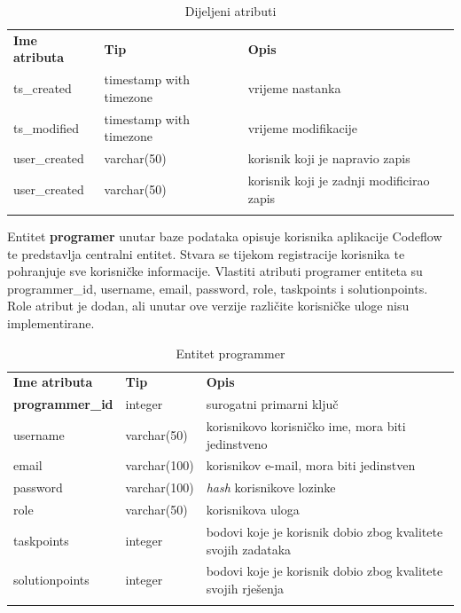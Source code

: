 \documentclass[times, utf8, zavrsni, numeric]{fer}
\begin{document}
		\begin{table}[H]
			\caption{Dijeljeni atributi}
			\label{tbl:dij-attr}
			\centering
			\begin{tabu} to \textwidth {XXX}
				\tabucline[1.75pt]{-}
				\textbf{Ime atributa} & \textbf{Tip} & \textbf{Opis}\\				
				\tabucline[1.75pt]{-}
				ts\_created & timestamp with timezone & vrijeme nastanka\\ \hline
				ts\_modified & timestamp with timezone & vrijeme modifikacije\\ \hline
				user\_created & varchar(50) & korisnik koji je napravio zapis\\ \hline
				user\_created & varchar(50) & korisnik koji je zadnji modificirao zapis\\
				\tabucline[1.75pt]{-}
			\end{tabu}
		\end{table}
		
		Entitet \textbf{programer} unutar baze podataka opisuje korisnika aplikacije Codeflow te predstavlja centralni entitet. Stvara se tijekom registracije korisnika te pohranjuje sve korisničke informacije. Vlastiti atributi programer entiteta su programmer\_id, username, email, password, role, taskpoints i solutionpoints. Role atribut je dodan, ali unutar ove verzije različite korisničke uloge nisu implementirane.
		\begin{table}[H]
			\caption{Entitet programmer}
			\label{tbl:programmer}
			\centering
			\begin{tabu} to \textwidth {XXX}
				\tabucline[1.75pt]{-}
				\textbf{Ime atributa} & \textbf{Tip} & \textbf{Opis}\\ 				
				\tabucline[1.75pt]{-}
				\textbf{programmer\_id} & integer & surogatni primarni ključ\\ \hline
				username & varchar(50) & korisnikovo korisničko ime, mora biti jedinstveno\\ \hline
				email & varchar(100) & korisnikov e-mail, mora biti jedinstven\\ \hline
				password & varchar(100) & \textit{hash} korisnikove lozinke\\ \hline
				role & varchar(50) & korisnikova uloga\\ \hline
				taskpoints & integer & bodovi koje je korisnik dobio zbog kvalitete svojih zadataka\\ \hline
				solutionpoints & integer &  bodovi koje je korisnik dobio zbog kvalitete svojih rješenja\\
				\tabucline[1.75pt]{-}
			\end{tabu}
		\end{table}
		
\end{document}
